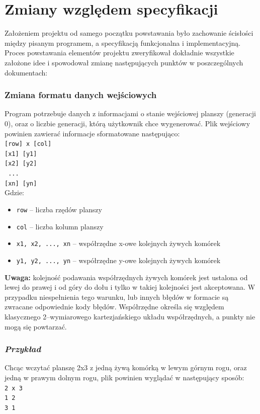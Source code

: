 \documentclass[11pt,a4paper]{report}
\begin{document}
\section{Zmiany względem specyfikacji}\label{sec:teskt}
Założeniem projektu od samego początku powstawania było zachowanie ścisłości między pisanym programem, a specyfikacją funkcjonalna i implementacyjną. Proces powstawania elementów projektu zweryfikował dokładnie wszystkie założone idee i spowodował zmianę następujących punktów w poszczególnych dokumentach:

\subsubsection {Zmiana formatu danych wejściowych}
Program potrzebuje danych z informacjami o stanie wejściowej planszy (generacji 0), oraz o liczbie generacji, którą użytkownik chce wygenerować. Plik wejściowy powinien zawierać informacje sformatowane następująco:\\
\texttt {[row] x [col]}\\
\texttt {[x1] [y1]}\\
\texttt {[x2] [y2]}\\
\texttt {   ...  }\\
\texttt {[xn] [yn]}\\
Gdzie:
\begin {itemize}
\item \texttt {row} -- liczba rzędów planszy
\item \texttt {col} -- liczba kolumn planszy
\item \texttt{x1, x2, ..., xn} -- współrzędne x-owe kolejnych żywych komórek
\item \texttt{y1, y2, ..., yn} -- współrzędne y-owe kolejnych żywych komórek
\end {itemize}
\textbf{Uwaga:} kolejność podawania współrzędnych żywych komórek jest ustalona od lewej do prawej i od góry do dołu i tylko w takiej kolejności jest akceptowana. W przypadku niespełnienia tego warunku, lub innych błędów w formacie są zwracane odpowiednie kody błędów. Współrzędne określa się względem klasycznego 2--wymiarowego kartezjańskiego układu współrzędnych, a punkty nie mogą się powtarzać.
\subsubsection {\textsl{Przykład}}
Chcąc wczytać planszę 2x3 z jedną żywą komórką w lewym górnym rogu, oraz jedną w prawym dolnym rogu, plik powinien wyglądać w następujący sposób: \\
\texttt {2 x 3} \\
\texttt {1 2} \\
\texttt {3 1} 
\end{document}
